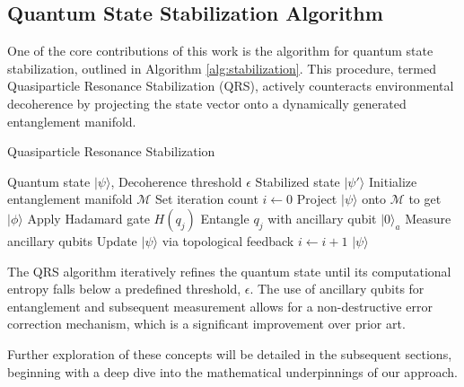 \subsection{Quantum State Stabilization Algorithm}
One of the core contributions of this work is the algorithm for quantum state stabilization, outlined in Algorithm \ref{alg:stabilization}. This procedure, termed Quasiparticle Resonance Stabilization (QRS), actively counteracts environmental decoherence by projecting the state vector onto a dynamically generated entanglement manifold.

\begin{algorithm}[h!]
\caption{Quasiparticle Resonance Stabilization}
\label{alg:stabilization}
\begin{algorithmic}[1]
\REQUIRE Quantum state $|\psi\rangle$, Decoherence threshold $\epsilon$
\ENSURE Stabilized state $|\psi'\rangle$
\STATE Initialize entanglement manifold $\mathcal{M}$
\STATE Set iteration count $i \leftarrow 0$
    \STATE Project $|\psi\rangle$ onto $\mathcal{M}$ to get $|\phi\rangle$
            \STATE Apply Hadamard gate $H(q_j)$
        \ELSE
            \STATE Entangle $q_j$ with ancillary qubit $|0\rangle_a$
        \ENDIF
    \ENDFOR
    \STATE Measure ancillary qubits
    \STATE Update $|\psi\rangle$ via topological feedback
    \STATE $i \leftarrow i + 1$
\ENDWHILE
\RETURN $|\psi\rangle$
\end{algorithmic}
\end{algorithm}

The QRS algorithm iteratively refines the quantum state until its computational entropy falls below a predefined threshold, $\epsilon$. The use of ancillary qubits for entanglement and subsequent measurement allows for a non-destructive error correction mechanism, which is a significant improvement over prior art.

Further exploration of these concepts will be detailed in the subsequent sections, beginning with a deep dive into the mathematical underpinnings of our approach.
